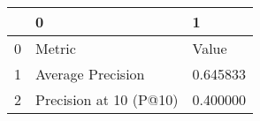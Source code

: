 \begin{tabular}{lll}
\toprule
 & 0 & 1 \\
\midrule
0 & Metric & Value \\
1 & Average Precision & 0.645833 \\
2 & Precision at 10 (P@10) & 0.400000 \\
\bottomrule
\end{tabular}
